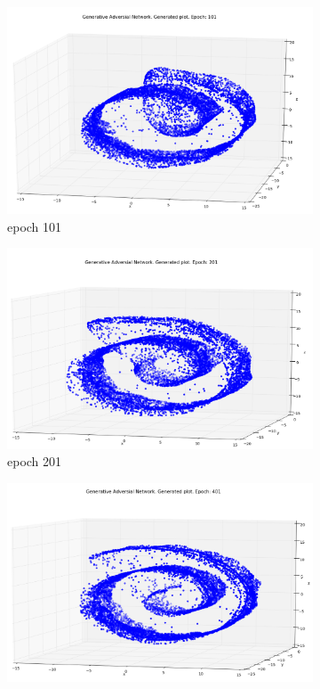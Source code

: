 \begin{figure}
\begin{subfigure}[t]{.4\textwidth}
\centering
\includegraphics[width=\linewidth]{GANResults/Gen101.png}
\caption{epoch 101}
\end{subfigure}
%
\begin{subfigure}[t]{.4\textwidth}
\centering
\includegraphics[width=\linewidth]{GANResults/Gen201.png}
\caption{epoch 201}
\end{subfigure}
\medskip
\begin{subfigure}[t]{.4\textwidth}
\centering
\includegraphics[width=\linewidth]{GANResults/Gen401.png}

\end{subfigure}
\end{figure}
